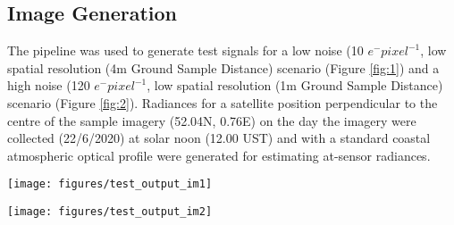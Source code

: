 \documentclass[10pt,a4paper,final,twocolumn]{article}
\begin{document}
\subsection{Image Generation}
The pipeline was used to generate test signals for a low noise (10 $e^- pixel ^{-1}$, low spatial resolution (4m Ground Sample Distance) scenario (Figure \ref{fig:1}) and  a high noise (120 $e^- pixel ^{-1}$, low spatial resolution (1m Ground Sample Distance) scenario (Figure \ref{fig:2}). Radiances for a satellite position perpendicular to the centre of the sample imagery (52.04N, 0.76E) on the day the imagery were collected (22/6/2020) at solar noon (12.00 UST) and with a standard coastal atmospheric optical profile were generated for estimating at-sensor radiances.

\begin{figure*}
\texttt{[image: figures/test\_output\_im1]}
\caption{Sample simulated signals (4m GSD, dark noise=10) using a pipeline based on Sentinel-2 VNIR bands and a CCD sensor. The input hyperspectral (A), simulated RGB (B), Predicted false colour NIR (C), Normalised Difference Vegetation Index (D) are shown as images and example input reflectance spectra (E) and example simulated reflectance spectra (F) are shown as line plots. }
\label{fig:1}
\end{figure*}

\begin{figure*}
\texttt{[image: figures/test\_output\_im2]}
\caption{Sample simulated signals (1m GSD, dark noise=120) using a pipeline based on Sentinel-2 VNIR bands and a CCD sensor. The input hyperspectral (A), simulated RGB (B), Predicted false colour NIR (C), Normalised Difference Vegetation Index (D) are shown as images and example input reflectance spectra (E) and example simulated reflectance spectra (F) are shown as line plots. }
\label{fig:2}
\end{figure*}

\begin{table*}
\caption{Processing steps (4m GSD, dark noise=10) using a pipeline based on Sentinel-2 VNIR bands and a CCD sensor corresponding to outputs in Figure \ref{fig:1} }
\small

\label{tab:params1}
\end{table*}

\begin{table*}
\caption{Processing steps (1m GSD, dark noise=120) using a pipeline based on Sentinel-2 VNIR bands and a CCD sensor corresponding to outputs in Figure \ref{fig:2} }
\small

\label{tab:params2}
\end{table*}
\end{document}

